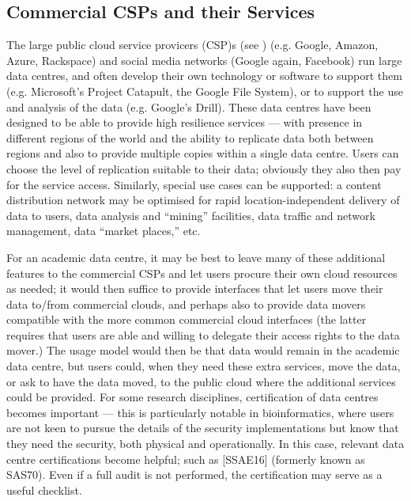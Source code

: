 \subsection{Commercial CSPs and their Services}


The large public cloud service provicers (CSP)s (see ) (e.g.
Google, Amazon, Azure, Rackspace) and social media networks (Google again,
Facebook) run large data centres, and often develop their own technology or
software to support them (e.g. Microsoft's Project Catapult, the Google File
System), or to support the use and analysis of the data (e.g. Google's Drill).
These data centres have been designed to be able to provide high resilience
services --- with presence in different regions of the world and the ability to
replicate data both between regions and also to provide multiple copies within a
single data centre.  Users can choose the level of replication suitable to their
data; obviously they also then pay for the service access.  Similarly, special
use cases can be supported: a content distribution network may be optimised for rapid
location-independent delivery of data to users, data analysis and ``mining''
facilities, data traffic and network management, data ``market places,'' etc.

For an academic data centre, it may be best to leave many of these additional
features to the commercial CSPs and let users procure their own cloud resources
as needed; it would then suffice to provide interfaces that let users move their
data to/from commercial clouds, and perhaps also to provide data movers
compatible with the more common commercial cloud interfaces (the latter requires
that users are able and willing to delegate their access rights to the data
mover.)  The usage model would then be that data would remain in the academic
data centre, but users could, when they need these extra services, move the
data, or ask to have the data moved, to the public cloud where the additional
services could be provided.  For some research disciplines, certification of
data centres becomes important --- this is particularly notable in
bioinformatics, where users are not keen to pursue the details of the security
implementations but know that they need the security, both physical and
operationally.  In this case, relevant data centre certifications become
helpful; such as [SSAE16] (formerly known as SAS70). Even if a full audit is not
performed, the certification may serve as a useful checklist.


